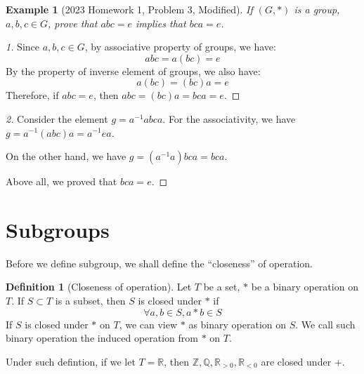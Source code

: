 \documentclass{article}
\theoremstyle{MyNonumberplain}
\theoremstyle{break}
\newtheorem*{proof}{Proof. }
\theoremstyle{break}
\newtheorem{example}{Example}[section]
\theoremstyle{break}
\theoremstyle{definition}
\theoremstyle{break}
\newtheorem{definition}{Definition}[section]
\begin{document}
\begin{expbox}
    \begin{example}[2023 Homework 1, Problem 3, Modified]
        If $(G, *)$ is a group, $a, b, c \in G$, prove that $abc = e$ implies that $bca = e$. 
    \end{example}
    \begin{prfbox}
        \begin{proof}[1]
            Since $a,b,c\in G$, by associative property of groups, we have:
            $$abc=a(bc)=e$$
            By the property of inverse element of groups, we also have:
            $$a(bc)=(bc)a=e$$
            Therefore, if $abc=e$, then $abc=(bc)a=bca=e$.              
        \end{proof}
    \end{prfbox}
    \begin{prfbox}
        \begin{proof}[2]
            Consider the element $g=a^{-1}abca$. For the associativity, we have $g=a^{-1}(abc)a=a^{-1}ea$.\bigskip

            On the other hand, we have $g=(a^{-1}a)bca=bca$.\bigskip

            Above all, we proved that $bca=e$.
        \end{proof}
    \end{prfbox}
\end{expbox}

\newpage

\section{Subgroups}

Before we define subgroup, we shall define the ``closeness'' of operation.

\begin{defbox}
    \begin{definition}[Closeness of operation]
        Let $T$ be a set, $*$ be a binary operation on $T$. If $S\subset T$ is a subset, then $S$ is closed under $*$ if 
        $$\forall a,b\in S, a*b\in S$$
        If $S$ is closed under $\ast$ on $T$, we can view $\ast$ as binary operation on $S$. We call such binary operation the induced operation from $\ast$ on
$T$.
    \end{definition}
\end{defbox}

Under such defintion, if we let $T =\mathbb{R}$, then $\mathbb{Z}, \mathbb{Q},
\mathbb{R}_{> 0}, \mathbb{R}_{< 0}$ are closed under +.
\end{document}
